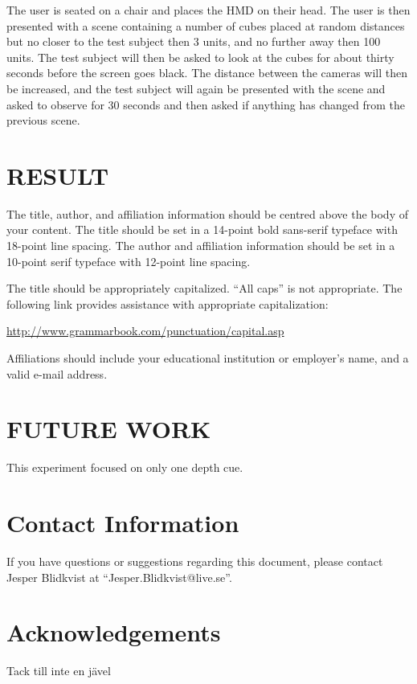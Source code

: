 \documentclass[tog]{acmsiggraph}
\begin{document}
The user is seated on a chair and places the HMD on their head. The user is then presented with a scene containing a number of cubes placed at random distances but no closer to the test subject then 3 units, and no further away then 100 units. The test subject will then be asked to look at the cubes for about thirty seconds before the screen goes black. The distance between the cameras will then be increased, and the test subject will again be presented with the scene and asked to observe for 30 seconds and then asked if anything has changed from the previous scene.  

\section{RESULT}

The title, author, and affiliation information should be centred
above the body of your content. The title should be set in a 14-point
bold sans-serif typeface with 18-point line spacing. The author and
affiliation information should be set in a 10-point serif typeface
with 12-point line spacing.

The title should be appropriately capitalized. ``All caps'' is not
appropriate. The following link provides assistance with appropriate
capitalization:

{\small\url{http://www.grammarbook.com/punctuation/capital.asp}}

Affiliations should include your educational institution or employer's
name, and a valid e-mail address.

\section{FUTURE WORK}

This experiment focused on only one depth cue. 




\section{Contact Information}

If you have questions or suggestions regarding this document, please
contact Jesper Blidkvist at ``Jesper.Blidkvist@live.se''.

\section*{Acknowledgements}

Tack till inte en jävel


\nocite{*}

\end{document}
